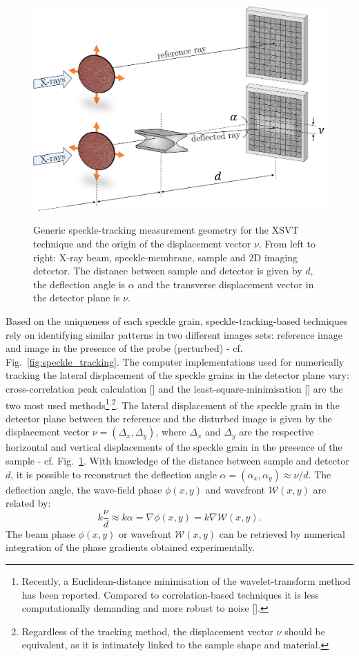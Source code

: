 \begin{refsection}
\begin{figure}[t]
        \centering
        {\includegraphics[width=0.6\linewidth]{figures/ch04/speckle_tracking2.png}}
        \caption[Speckle tracking geometry]{Generic speckle-tracking measurement geometry for the XSVT technique and the origin of the displacement vector $\nu$. From left to right: X-ray beam, speckle-membrane, sample and 2D imaging detector. The distance between sample and detector is given by $d$, the deflection angle is $\alpha$ and the transverse displacement vector in the detector plane is $\nu$.} \label{fig:speckle_tracking2}
\end{figure}

Based on the uniqueness of each speckle grain, speckle-tracking-based techniques rely on identifying similar patterns in two different images sets: reference image and image in the presence of the probe (perturbed) - cf. Fig.~\ref{fig:speckle_tracking}. The computer implementations used for numerically tracking the lateral displacement of the speckle grains in the detector plane vary: cross-correlation peak calculation [\cite{Berujon2012, Morgan2012}] and the least-square-minimisation [\cite{Zanette2014, Zdora2017}] are the two most used methods\footnote{Recently, a Euclidean-distance minimisation of the wavelet-transform method has been reported. Compared to correlation-based techniques it is less computationally demanding and more robust to noise [\cite{Qiao2020b}].}$^{,}$\footnote{Regardless of the tracking method, the displacement vector $\nu$ should be equivalent, as it is intimately linked to the sample shape and material.}. The lateral displacement of the speckle grain in the detector plane between the reference and the disturbed image is given by the displacement vector $\nu=(\Delta_x,\Delta_y)$, where $\Delta_x$ and $\Delta_y$ are the respective horizontal and vertical displacements of the speckle grain in the presence of the sample - cf. Fig.~\ref{fig:speckle_tracking2}. With knowledge of the distance between sample and detector $d$, it is possible to reconstruct the deflection angle $\alpha=(\alpha_x,\alpha_y)\approx\nu/d$. The deflection angle, the wave-field phase $\phi(x,y)$ and wavefront $\mathcal{W}(x,y)$ are related by:
\begin{equation}\label{eq:wavefront_gradient}
    k\frac{\nu}{d} \approx k \alpha = \nabla\phi(x,y) = k \nabla\mathcal{W}(x,y).
\end{equation}
The beam phase $\phi(x,y)$ or wavefront $\mathcal{W}(x,y)$ can be retrieved by numerical integration of the phase gradients obtained experimentally.


\end{refsection}
